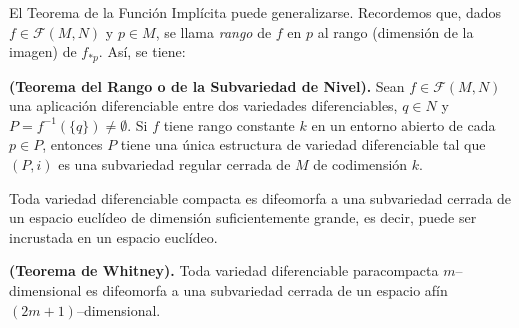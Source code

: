 \documentclass[cursovd_portada.tex]{subfiles}
\begin{document}
\newpage

El Teorema de la Función Implícita puede generalizarse.
Recordemos que, dados $f\in \mathcal{F}(M,N)$ y $p \in M$, se
llama {\it rango} de $f$ en $p$ al rango (dimensión de la
imagen) de $f_{*p}$. Así, se tiene:

\begin{teorema}
{\bf (Teorema del Rango o de la Subvariedad de Nivel).} Sean
$f\in\mathcal{F}(M,N)$ una aplicación diferenciable entre dos
variedades diferenciables, $q\in N$ y
$P=f^{-1}(\{q\})\neq\emptyset$. Si $f$ tiene rango constante $k$
en un entorno abierto de cada $p\in P$, entonces $P$ tiene una
única estructura de variedad diferenciable tal que $(P,i)$ es
una subvariedad regular cerrada de $M$ de codimensión $k$.
\end{teorema}

\begin{teorema}
Toda variedad diferenciable compacta es difeomorfa a una subvariedad cerrada de un espacio euclídeo de dimensión
suficientemente grande, es decir, puede ser incrustada en un espacio euclídeo.
\end{teorema}
\begin{teorema}
{\bf (Teorema de Whitney).} Toda variedad diferenciable paracompacta $m$--dimensional es difeomorfa a una
subvariedad cerrada de un espacio afín $(2m+1)$--dimensional.
\end{teorema}
\end{document}
